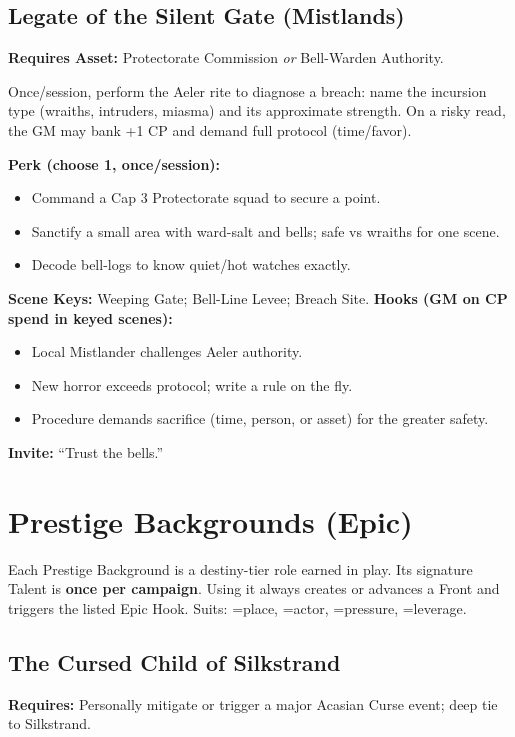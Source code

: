 \subsection{Legate of the Silent Gate (Mistlands)}
\textbf{Requires Asset:} Protectorate Commission \emph{or} Bell-Warden Authority.
\begin{tcolorbox}[enhanced,sharp corners,boxrule=.6pt,title={Talent — Breath-Test (8 XP)}]
Once/session, perform the Aeler rite to diagnose a breach: name the incursion type (wraiths, intruders, miasma) and its approximate strength. On a risky read, the GM may bank +1 CP and demand full protocol (time/favor).
\end{tcolorbox}
\textbf{Perk (choose 1, once/session):}
\begin{itemize}
  \item Command a Cap 3 Protectorate squad to secure a point.
  \item Sanctify a small area with ward-salt and bells; safe vs wraiths for one scene.
  \item Decode bell-logs to know quiet/hot watches exactly.
\end{itemize}
\textbf{Scene Keys:} Weeping Gate; Bell-Line Levee; Breach Site.
\textbf{Hooks (GM on CP spend in keyed scenes):}
\begin{itemize}
  \item Local Mistlander challenges Aeler authority.
  \item New horror exceeds protocol; write a rule on the fly.
  \item Procedure demands sacrifice (time, person, or asset) for the greater safety.
\end{itemize}
\textbf{Invite:} “Trust the bells.”

\section{Prestige Backgrounds (Epic)}

Each Prestige Background is a destiny-tier role earned in play. Its signature Talent is \textbf{once per campaign}. Using it always creates or advances a Front and triggers the listed Epic Hook. Suits: \SuitSpade=place, \SuitHeart=actor, \SuitClub=pressure, \SuitDiamond=leverage.

\subsection{The Cursed Child of Silkstrand}
\textbf{Requires:} Personally mitigate or trigger a major Acasian Curse event; deep tie to Silkstrand.

